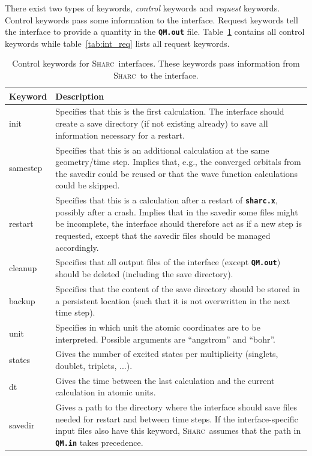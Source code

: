 \documentclass[a4paper,10pt,DIV=15,openany]{scrbook}
\newcommand{\sharc}{\textsc{Sharc}}
\newcommand{\ttt}[1]{\textbf{\texttt{#1}}}
\begin{document}
There exist two types of keywords, \textit{control} keywords and \textit{request} keywords. Control keywords pass some information to the interface. Request keywords tell the interface to provide a quantity in the \ttt{QM.out} file. Table~\ref{tab:int_ctrl} contains all control keywords while table~\ref{tab:int_req} lists all request keywords.



\begin{table}
  \centering
  \caption[Control keywords for \sharc\ interfaces.]{Control keywords for \sharc\ interfaces. These keywords pass information from \sharc\ to the interface.}
  \label{tab:int_ctrl}
  \begin{tabular}{>{\ttfamily}lp{13cm}}
  \hline
  Keyword       &Description\\
  \hline
  init            &Specifies that this is the first calculation. The interface should create a save directory (if not existing already) to save all information necessary for a restart. \\
  samestep        &Specifies that this is an additional calculation at the same geometry/time step. Implies that, e.g., the converged orbitals from the savedir could be reused or that the wave function calculations could be skipped.\\
  restart         &Specifies that this is a calculation after a restart of \ttt{sharc.x}, possibly after a crash. Implies that in the savedir some files might be incomplete, the interface should therefore act as if a new step is requested, except that the savedir files should be managed accordingly.\\
  cleanup         &Specifies that all output files of the interface (except \ttt{QM.out}) should be deleted (including the save directory).\\
  backup          &Specifies that the content of the save directory should be stored in a persistent location (such that it is not overwritten in the next time step).\\
  unit            &Specifies in which unit the atomic coordinates are to be interpreted. Possible arguments are ``angstrom'' and ``bohr''.\\
  states          &Gives the number of excited states per multiplicity (singlets, doublet, triplets, ...).\\
  dt              &Gives the time between the last calculation and the current calculation in atomic units.\\
  savedir         &Gives a path to the directory where the interface should save files needed for restart and between time steps. If the interface-specific input files also have this keyword, \sharc\ assumes that the path in \ttt{QM.in} takes precedence.\\
  \hline
  \end{tabular}
\end{table}
\end{document}

